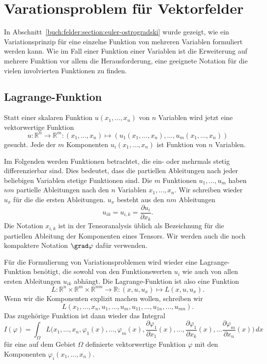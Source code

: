 %
%
%
\section{Varationsproblem für Vektorfelder
\label{buch:felder:section:vektorfelder}}
In Abschnitt~\ref{buch:felder:section:euler-ostrogradski} wurde gezeigt,
wie ein Variationsprinzip für eine einzelne Funktion von mehreren Variablen
formuliert werden kann.
Wie im Fall einer Funktion einer Variablen ist die Erweiterung auf
mehrere Funktion vor allem die Herausforderung, eine geeignete Notation
für die vielen involvierten Funktionen zu finden.

%
%
\subsection{Lagrange-Funktion
\label{buch:felder:vektorfeilder:subsetion:lagrange-funktion}}
Statt einer skalaren Funktion $u(x_1,\dots,x_n)$ von $n$ Variablen
wird jetzt eine vektorwertige Funktion
\[
u
\colon
\mathbb{R}^n \to \mathbb{R}^m
:
(x_1,\dots,x_n)
\mapsto
(
u_1(x_1,\dots,x_n)
,\dots,
u_m(x_1,\dots,x_n)
)
\]
gesucht.
Jede der $m$ Komponenten $u_i(x_1,\dots,x_n)$ ist Funktion von
$n$ Variablen.

Im Folgenden werden Funktionen betrachtet, die ein- oder mehrmals
stetig differenzierbar sind.
Dies bedeutet, dass die partiellen Ableitungen nach jeder beliebigen
Variablen stetige Funktionen sind.
Die $m$ Funktionen $u_1,\dots,u_m$ haben $nm$ partielle Ableitungen
nach den $n$ Variablen $x_1,\dots,x_n$.
Wir schreiben wieder $u_x$ für die die ersten Ableitungen.
$u_x$ besteht aus den $nm$ Ableitungen 
\[
u_{ik}
=
u_{i,k}
=
\frac{\partial u_i}{\partial x_k}.
\]
Die Notation $x_{i,k}$ ist in der Tensoranalysis üblich als Bezeichnung
für die partiellen Ableitung der Komponenten eines Tensors.
Wir werden auch die noch kompaktere Notation $\grad\varphi$ dafür 
verwenden.

Für die Formulierung von Variationsproblemen wird wieder eine
Lagrange-Funktion benötigt, die sowohl von den Funktionswerten
$u_i$ wie auch von allen ersten Ableitungen $u_{ik}$ abhängt.
Die Lagrange-Funktion ist also eine Funktion
\begin{equation*}
L
\colon
\mathbb{R}^n\times \mathbb{R}^m \times \mathbb{R}^{nm}\to\mathbb{R}
:
(x,u,u_x)
\mapsto
L(x,u,u_x).
\end{equation*}
Wenn wir die Komponenten explizit machen wollen, schreiben wir
\[
L(x_1,\dots,x_n,u_1,\dots,u_m,u_{11},\dots,u_{1n},\dots,u_{mn}).
\]
Das zugehörige Funktion ist dann wieder das Integral
\begin{equation}
I(\varphi)
=
\int_{\Omega}
L\biggl(x_1,\dots,x_n,
\varphi_1(x),\dots,\varphi_m(x),
\frac{\partial\varphi_1}{\partial x_1}(x),
\dots,
\frac{\partial\varphi_1}{\partial x_k}(x),
\dots
\frac{\partial\varphi_m}{\partial x_n}(x)
\biggr)
\,dx
\label{buch:felder:vektorfelder:eqn:lagrange-funktional}
\end{equation}
für eine auf dem Gebiet $\Omega$ definierte vektorwertige Funktion
$\varphi$ mit den Komponenten $\varphi_i(x_1,\dots,x_n)$.

